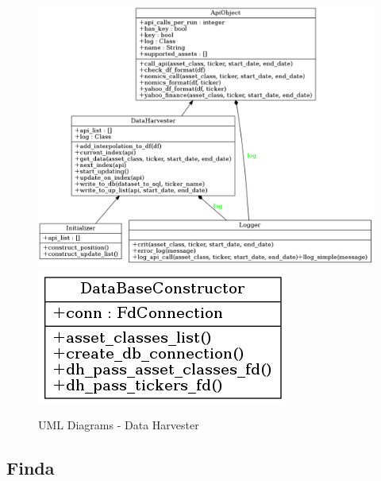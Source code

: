 \documentclass[main.tex]{subfiles}
\begin{document}
\begin{figure}[H]
   \centering
   \includegraphics[width=\textwidth,keepaspectratio]{Report/08Appendices/084UML/084Pictures/classes_dhav_core_1.png}
   \includegraphics[scale=2.0,keepaspectratio]{Report/08Appendices/084UML/084Pictures/classes_dhav_core_2.png}
   \caption{UML Diagrams - Data Harvester}
\end{figure}

\subsection{Finda}
\end{document}
